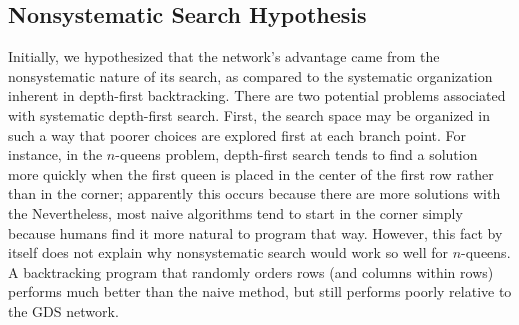\documentclass[twoside,12pt,titlepage,a4paper]{article}
\begin{document}
\vspace*{-0.05in}
\subsection{Nonsystematic Search Hypothesis}
\vspace*{-0.05in}

Initially, we hypothesized that the network's advantage came from the
nonsystematic nature of its search, as compared to the systematic
organization inherent in depth-first backtracking. There are two
potential problems associated with systematic depth-first search.
First, the search space may be organized in such a way that poorer
choices are explored first at each branch point.  For instance, in the
$n$-queens problem, depth-first search tends to find a solution more
quickly when the first queen is placed in the center of the first row
rather than in the corner; apparently this occurs because
there are more solutions with the
Nevertheless,
most naive algorithms tend to start in the corner simply because
humans find it more natural to program that way.  However, this fact
by itself does not explain why nonsystematic search would work so well
for $n$-queens.  A backtracking program that randomly orders rows (and
columns within rows) performs much better than the naive method, but
still performs poorly relative to the GDS network.
\end{document}

